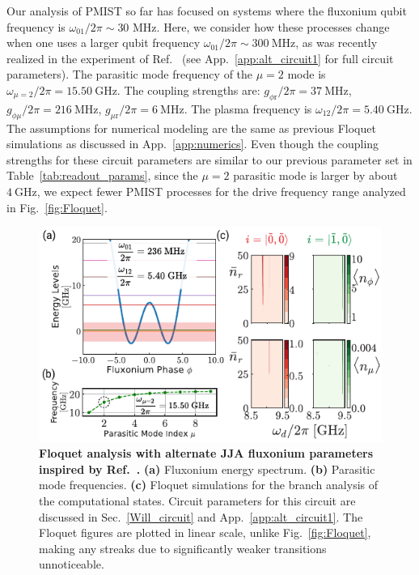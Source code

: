 \documentclass[%
reprint,
superscriptaddress,
 amsmath,amssymb,
 aps,
 prx,
longbibliography,
floatfix,
]{revtex4-2}
\begin{document}
Our analysis of PMIST so far has focused on systems where the fluxonium qubit frequency is $\omega_{01} / 2 \pi \sim 30$ MHz. Here, we consider how these processes change when one uses a larger qubit frequency $\omega_{01}/2\pi \sim 300 \ \mathrm{MHz}$, as was recently realized in the experiment of Ref.~\cite{ding_high-fidelity_2023} (see App.~\ref{app:alt_circuit1} for full circuit parameters). The parasitic mode frequency of the $\mu=2$ mode is $\omega_{\mu=2}/2\pi=15.50 \ \mathrm{GHz}$. The coupling strengths are: $g_{\phi \textrm{r}}/2\pi=37 \ \mathrm{MHz}$, $g_{\phi\mu}/2\pi=216 \ \mathrm{MHz}$, $g_{\mu \textrm{r}}/2\pi=6 \ \mathrm{MHz}$. The plasma frequency is $\omega_{12}/2\pi=5.40 \ \mathrm{GHz}$. The assumptions for numerical modeling are the same as previous Floquet simulations as discussed in App.~\ref{app:numerics}. Even though the coupling strengths for these circuit parameters are similar to our previous parameter set in Table~\ref{tab:readout_params}, since the $\mu=2$ parasitic mode is larger by about $4 \ \mathrm{GHz}$, we expect fewer PMIST processes for the drive frequency range analyzed in Fig.~\ref{fig:Floquet}.

\begin{figure}[t]
    \centering
    \includegraphics[width=\linewidth]{Figures/Floquet_Will.pdf}
    \caption{{\bf Floquet analysis with alternate JJA fluxonium parameters inspired by Ref.~\cite{ding_high-fidelity_2023}.} \textbf{(a)} Fluxonium energy spectrum. \textbf{(b)} Parasitic mode frequencies. \textbf{(c)} Floquet simulations for the branch analysis of the computational states. Circuit parameters for this circuit are discussed in Sec.~\ref{Will_circuit} and App.~\ref{app:alt_circuit1}. The Floquet figures are plotted in linear scale, unlike Fig.~\ref{fig:Floquet}, making any streaks due to significantly weaker transitions unnoticeable.}
    \label{fig:Floquet1}
\end{figure}
\end{document}
